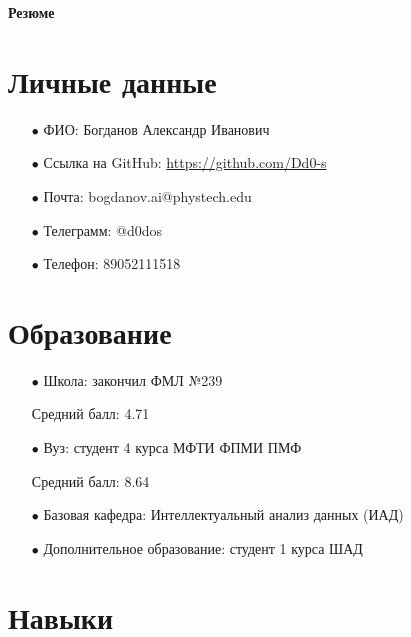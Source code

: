 \documentclass[a4paper,12pt]{article}
\begin{document}
 

\begin{center}
\Huge{\textbf{Резюме}}
\end{center}

\section*{Личные данные}

    \begin{enumerate}

        \item[$\bullet$] ФИО: Богданов Александр Иванович

        \item[$\bullet$] Ссылка на GitHub: \url{https://github.com/Dd0-s} 

        \item[$\bullet$] Почта: bogdanov.ai@phystech.edu

        \item[$\bullet$] Телеграмм: @d0dos

        \item[$\bullet$] Телефон: 89052111518

    \end{enumerate}

\section*{Образование}

    \begin{enumerate}

        \item[$\bullet$] Школа: закончил ФМЛ №239

        Средний балл: 4.71

        \item[$\bullet$] Вуз: студент 4 курса МФТИ ФПМИ ПМФ

        Средний балл: 8.64

        \item[$\bullet$] Базовая кафедра: Интеллектуальный анализ данных (ИАД)

        \item[$\bullet$] Дополнительное образование: студент 1 курса ШАД

    \end{enumerate}

\section*{Навыки}
\end{document}
